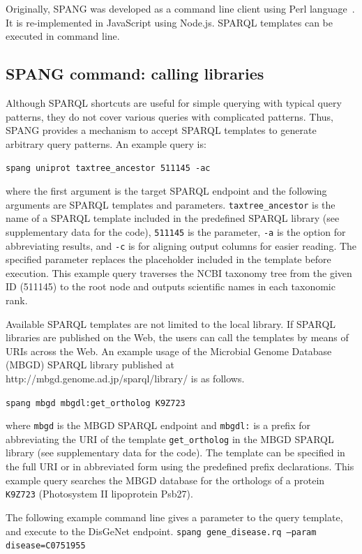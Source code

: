 \documentclass[runningheads]{llncs}
\begin{document}
Originally, SPANG was developed as a command line client using Perl language~\cite{spang}.
It is re-implemented in JavaScript using Node.js.
SPARQL templates can be executed in command line.


\subsection{SPANG command: calling libraries}

Although SPARQL shortcuts are useful for simple querying with typical query patterns, they do not cover various
queries with complicated patterns. 
Thus, SPANG provides a mechanism to accept SPARQL templates to generate arbitrary query patterns. 
An example query is: 

\texttt{spang uniprot taxtree\_ancestor 511145 -ac}

\noindent where the first argument is the target SPARQL endpoint and the following arguments are SPARQL templates and parameters. {\tt taxtree\_ancestor} is the name of a SPARQL template included in the predefined SPARQL library (see supplementary data for the code), {\tt 511145} is the parameter, {\tt -a} is the option for abbreviating results, and {\tt -c} is for aligning output columns for easier reading.
The specified parameter replaces the placeholder included in the template before execution. 
This example query traverses the NCBI taxonomy tree from the given ID (511145) to the root node and outputs scientific names in each taxonomic rank.


Available SPARQL templates are not limited to the local library.
If SPARQL libraries are published on the Web, the users can call the templates by means of URIs across the Web.
An example usage of the Microbial Genome Database (MBGD) SPARQL library published at http://mbgd.genome.ad.jp/sparql/library/ is as follows.

\texttt{spang mbgd mbgdl:get\_ortholog K9Z723}

where {\tt mbgd} is the MBGD SPARQL endpoint \citep{Chiba} and \texttt{mbgdl:} is a prefix for abbreviating the URI of the template {\tt get\_ortholog} in the MBGD SPARQL library (see supplementary data for the code). 
The template can be specified in the full URI or in abbreviated form using the predefined prefix declarations.
This example query searches the MBGD database \citep{Uchiyama} for the orthologs of a protein \texttt{K9Z723} (Photosystem II lipoprotein Psb27).

The following example command line gives a parameter to the query template, and execute to the DisGeNet endpoint.
\texttt{spang gene\_disease.rq --param disease=C0751955}
\end{document}

